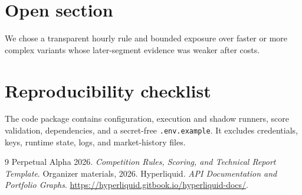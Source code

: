 \documentclass[a4paper,9pt]{article}
\begin{document}
\section{Open section}
We chose a transparent hourly rule and bounded exposure over faster or more
complex variants whose later-segment evidence was weaker after costs.

\appendix\section{Reproducibility checklist}
The code package contains configuration, execution and shadow runners, score
validation, dependencies, and a secret-free \texttt{.env.example}. It excludes
credentials, keys, runtime state, logs, and market-history files.
\begin{thebibliography}{9}\small
{} Perpetual Alpha 2026. \emph{Competition Rules, Scoring, and Technical Report Template}. Organizer materials, 2026.
 Hyperliquid. \emph{API Documentation and Portfolio Graphs}. \url{https://hyperliquid.gitbook.io/hyperliquid-docs/}.
\end{thebibliography}
\end{document}
